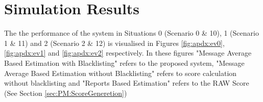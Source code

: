 \documentclass[journal]{IEEEtran}
\begin{document}
\section{Simulation Results}
\label{apdx:simResults}

The the performance of the system in Situations 0 (Scenario 0 \& 10), 1 (Scenario 1 \& 11) and 2 (Scenario 2 \& 12) is visualised in Figures  \ref{fig:apdx:ev0}, \ref{fig:apdx:ev1} and \ref{fig:apdx:ev2} respectively.
In these figures "Message Average Based Estimation with Blacklisting" refers to the proposed system, "Message Average Based Estimation without Blacklisting" refers to score calculation without blacklisting and "Reports Based Estimation" refers to the RAW Score (See Section \ref{sec:PM:ScoreGeneretion})
\begin{figure}[!ht]
	\centering
\end{figure}
\end{document}
